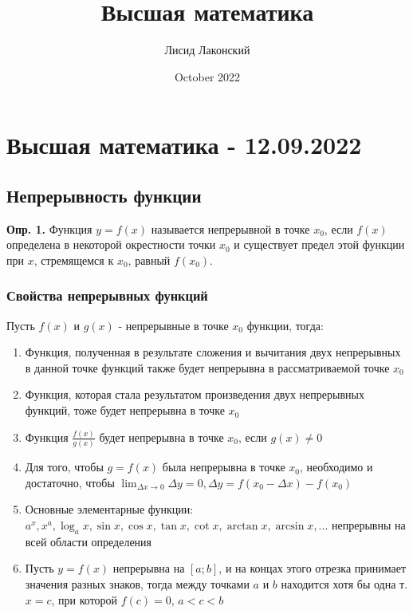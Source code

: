 \documentclass{article}
\title{Высшая математика}
\author{Лисид Лаконский}
\date{October 2022}
\begin{document}
\maketitle

\tableofcontents
\pagebreak

\section{Высшая математика - 12.09.2022}

\subsection{Непрерывность функции}

\textbf{Опр. 1.} Функция $y = f(x)$ называется непрерывной в точке $x_0$, если $f(x)$ определена в некоторой окрестности точки $x_0$ и существует предел этой функции при $x$, стремящемся к $x_0$, равный $f(x_0)$.

\subsubsection{Свойства непрерывных функций}

Пусть $f(x)$ и $g(x)$ - непрерывные в точке $x_0$ функции, тогда:

\begin{enumerate}
    \item Функция, полученная в результате сложения и вычитания двух непрерывных в данной точке функций также будет непрерывна в рассматриваемой точке $x_0$
    \item Функция, которая стала результатом произведения двух непрерывных функций, тоже будет непрерывна в точке $x_0$
    \item Функция $\frac{f(x)}{g(x)}$ будет непрерывна в точке $x_0$, если $g(x) \ne 0$
    \item Для того, чтобы $g = f(x)$ была непрерывна в точке $x_0$, необходимо и достаточно, чтобы $\lim_{\Delta x \to 0} \Delta y = 0, \Delta y = f(x_0 - \Delta x) - f(x_0)$
    \item Основные элементарные функции: $a^x, x^a, \log_{a} x, \sin x, \cos x, \tan x, \cot x, \arctan x, \arcsin x, ...$ непрерывны на всей области определения
    \item Пусть $y=f(x)$ непрерывна на $[a; b]$, и на концах этого отрезка принимает значения разных знаков, тогда между точками $a$ и $b$ находится хотя бы одна т. $x = c$, при которой $f(c) = 0$, $a < c < b$
\end{enumerate}
\end{document}
